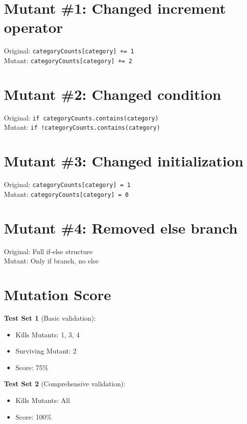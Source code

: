 \documentclass{scrreprt}
\begin{document}
\section{Mutant \#1: Changed increment operator}
Original: \texttt{categoryCounts[category] += 1} \\
Mutant: \texttt{categoryCounts[category] += 2}

\section{Mutant \#2: Changed condition}
Original: \texttt{if categoryCounts.contains(category)} \\
Mutant: \texttt{if !categoryCounts.contains(category)}

\section{Mutant \#3: Changed initialization}
Original: \texttt{categoryCounts[category] = 1} \\
Mutant: \texttt{categoryCounts[category] = 0}

\section{Mutant \#4: Removed else branch}
Original: Full if-else structure \\
Mutant: Only if branch, no else

\section{Mutation Score}

\textbf{Test Set 1} (Basic validation):
\begin{itemize}
    \item Kills Mutants: 1, 3, 4
    \item Surviving Mutant: 2
    \item Score: 75\%
\end{itemize}

\textbf{Test Set 2} (Comprehensive validation):
\begin{itemize}
    \item Kills Mutants: All
    \item Score: 100\%
\end{itemize}
\end{document}

